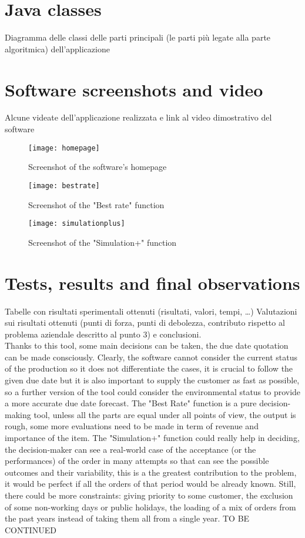 \documentclass[a4paper,12pt]{article}
\begin{document}
\newpage
\section{Java classes}
Diagramma delle classi delle parti principali (le parti più legate alla parte algoritmica) dell’applicazione

\newpage
\section{Software screenshots and video}
Alcune videate dell’applicazione realizzata e link al video dimostrativo del software
\begin{figure}[H]
	\centering
   	 \texttt{[image: homepage]}
	\caption{Screenshot of the software's homepage}
\end{figure}

\begin{figure}[H]
	\centering
   	 \texttt{[image: bestrate]}
	\caption{Screenshot of the "Best rate" function}
\end{figure}

\begin{figure}[H]
	\centering
   	 \texttt{[image: simulationplus]}
	\caption{Screenshot of the "Simulation+" function}
\end{figure}

\newpage
\section{Tests, results and final observations}
Tabelle con risultati sperimentali ottenuti (risultati, valori, tempi, …)
Valutazioni sui risultati ottenuti (punti di forza, punti di debolezza, contributo rispetto al problema aziendale descritto al punto 3) e conclusioni.\\
Thanks to this tool, some main decisions can be taken, the due date quotation can be made consciously. Clearly, the software cannot consider the current status of the production so it does not differentiate the cases, it is crucial to follow the given due date but it is also important to supply the customer as fast as possible, so a further version of the tool could consider the environmental status to provide a more accurate due date forecast. The "Best Rate" function is a pure decision-making tool, unless all the parts are equal under all points of view, the output is rough, some more evaluations need to be made in term of revenue and importance of the item. The "Simulation+" function could really help in deciding, the decision-maker can see a real-world case of the acceptance (or the performances) of the order in many attempts so that can see the possible outcomes and their variability, this is a the greatest contribution to the problem, it would be perfect if all the orders of that period would be already known. Still, there could be more constraints: giving priority to some customer, the exclusion of some non-working days or public holidays, the loading of a mix of orders from the past years instead of taking them all from a single year.  TO BE CONTINUED
\end{document}
